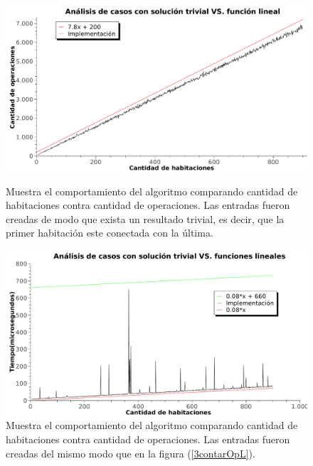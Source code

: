 
\begin{figure}[htb]
    \begin{minipage}{\textwidth}
	\begin{center}
		\includegraphics[width=\textwidth]{../ej3/graficos/3_ej_contarOperacionesL.pdf}
		\caption{Muestra el comportamiento del algoritmo comparando cantidad de habitaciones contra cantidad de operaciones. Las entradas fueron creadas de modo que exista un resultado trivial, es decir, que la primer habitación este conectada con la última.}
		\label{3contarOpL}
	\end{center}
    \end{minipage}

    \begin{minipage}{\textwidth}
	\begin{center}
		\includegraphics[width=\textwidth]{../ej3/graficos/3_ej_contarTiempoL.pdf}
		\caption{Muestra el comportamiento del algoritmo comparando cantidad de habitaciones contra cantidad de operaciones. Las entradas fueron creadas del mismo modo que en la figura (\ref{3contarOpL}).}
		\label{3contarTiempoL}
	\end{center}
    \end{minipage}

\end{figure}

